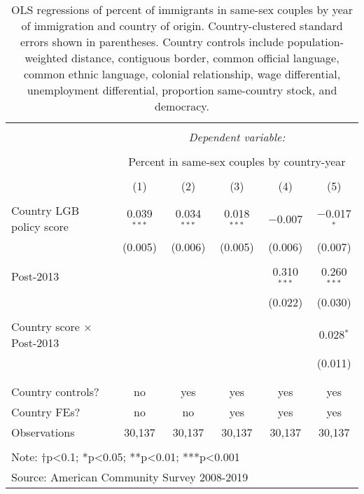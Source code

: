 \documentclass[
  11pt,
]{article}
\begin{document}
\begin{table}[!htbp] \centering 
  \caption{OLS regressions of percent of immigrants in same-sex couples by year of immigration and country of origin. Country-clustered standard errors shown in parentheses. Country controls include population-weighted distance, contiguous border, common official language, common ethnic language, colonial relationship, wage differential, unemployment differential, proportion same-country stock, and democracy.} 
  \label{tab:country-props} 
\begin{tabular}{@{\extracolsep{5pt}}lccccc} 
\\[-1.8ex]\hline 
\hline \\[-1.8ex] 
 & \multicolumn{5}{c}{\textit{Dependent variable:}} \\ 
\cline{2-6} 
\\[-1.8ex] & \multicolumn{5}{c}{Percent in same-sex couples by country-year} \\ 
\\[-1.8ex] & (1) & (2) & (3) & (4) & (5)\\ 
\hline \\[-1.8ex] 
 Country LGB policy score & 0.039$^{***}$ & 0.034$^{***}$ & 0.018$^{***}$ & $-$0.007 & $-$0.017$^{*}$ \\ 
  & (0.005) & (0.006) & (0.005) & (0.006) & (0.007) \\ 
  & & & & & \\ 
 Post-2013 &  &  &  & 0.310$^{***}$ & 0.260$^{***}$ \\ 
  &  &  &  & (0.022) & (0.030) \\ 
  & & & & & \\ 
 Country score × Post-2013 &  &  &  &  & 0.028$^{*}$ \\ 
  &  &  &  &  & (0.011) \\ 
  & & & & & \\ 
\hline \\[-1.8ex] 
Country controls? & no & yes & yes & yes & yes \\ 
Country FEs? & no & no & yes & yes & yes \\ 
Observations & 30,137 & 30,137 & 30,137 & 30,137 & 30,137 \\ 
\hline 
\hline \\[-1.8ex] 
\multicolumn{6}{l}{Note: †p<0.1; *p<0.05; **p<0.01; ***p<0.001} \\ 
\multicolumn{6}{l}{Source: American Community Survey 2008-2019} \\ 
\end{tabular} 
\end{table}
\end{document}

